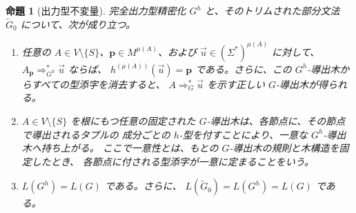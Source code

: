 \documentclass[11pt,a4paper]{ltjsarticle}
\newtheorem{proposition}[theorem]{命題}
\theoremstyle{remark}
\newcommand{\tuple}[1]{\vec{#1}}
\begin{document}
\begin{proposition}[出力型不変量]
\label{prop:output-invariants}
完全出力型精密化 \(G^h\) と、そのトリムされた部分文法
\(\widetilde G_0\) について、次が成り立つ。
\begin{enumerate}[label=(\roman*),leftmargin=*]
\item 任意の \(A\in V\setminus\{S\}\)、\(\mathbf p\in M^{\mu(A)}\)、および
      \(\tuple u\in(\Sigma^*)^{\mu(A)}\) に対して、
      \(A_{\mathbf p}\Rightarrow_{G^h}^*\tuple u\) ならば、
      \(h^{(\mu(A))}(\tuple u)=\mathbf p\) である。さらに、この
      \(G^h\)-導出木からすべての型添字を消去すると、
      \(A\Rightarrow_G^*\tuple u\) を示す正しい \(G\)-導出木が得られる。

\item \(A\in V\setminus\{S\}\) を根にもつ任意の固定された
      \(G\)-導出木は、各節点に、その節点で導出されるタプルの
      成分ごとの \(h\)-型を付すことにより、一意な
      \(G^h\)-導出木へ持ち上がる。
      ここで一意性とは、もとの \(G\)-導出木の規則と木構造を固定したとき、
      各節点に付される型添字が一意に定まることをいう。

\item \(L(G^h)=L(G)\) である。さらに、
      \(L(\widetilde G_0)=L(G^h)=L(G)\) である。
\end{enumerate}
\end{proposition}
\end{document}
